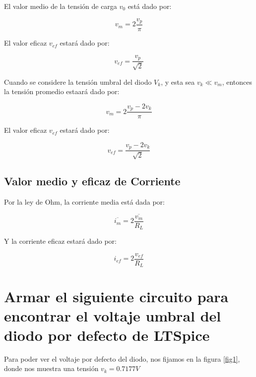 \documentclass[a4paper]{article} %
\begin{document}
El valor medio de la tensión de carga $v_0$ está dado por:

\begin{equation}
	v_m = 2\frac{v_p}{\pi}
\end{equation}

El valor eficaz $v_{ef}$ estará dado por:

\begin{equation}
	v_{ef} = \frac{v_p}{\sqrt{2}}
\end{equation}


Cuando se considere la tensión umbral del diodo $V_k$, y esta sea $v_k \ll v_m$, entonces la tensión promedio estaará dado por:

\begin{equation}
	v_m = 2\frac{v_p - 2v_k}{\pi}
\end{equation}

El valor eficaz $v_{ef}$ estará dado por:

\begin{equation}
	v_{ef} = \frac{v_p - 2v_k}{\sqrt{2}}
\end{equation}


\subsection{Valor medio y eficaz de Corriente}

Por la ley de Ohm, la corriente media está dada por:

\begin{equation}
	\overline{i_{m}} = 2\frac{\overline{v_{m}}}{R_L}
\end{equation}

Y la corriente eficaz estará dado por:

\begin{equation}
	i_{ef} = 2\frac{v_{ef}}{R_L}
\end{equation}

\section{Armar el siguiente circuito para encontrar el voltaje umbral del diodo por defecto de LTSpice}

Para poder ver el voltaje por defecto del diodo, nos fijamos en la figura \eqref{fig1}, donde nos muestra una tensión $v_k = 0.7177V$
\end{document}
